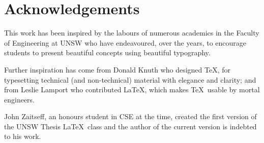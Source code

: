 \chapter*{Acknowledgements}\label{ack}

This work has been inspired by the labours of numerous academics in
the Faculty of Engineering at UNSW who have endeavoured, over the years, to
encourage students to present beautiful concepts using beautiful
typography.

Further inspiration has come from Donald Knuth who designed \TeX, for
typesetting technical (and non-technical) material with elegance and
clarity; and from Leslie Lamport who contributed \LaTeX, which makes
\TeX\ usable by mortal engineers.

John Zaitseff, an honours student in CSE at the time, created the
first version of the UNSW Thesis \LaTeX\ class and the author of the
current version is indebted to his work.
